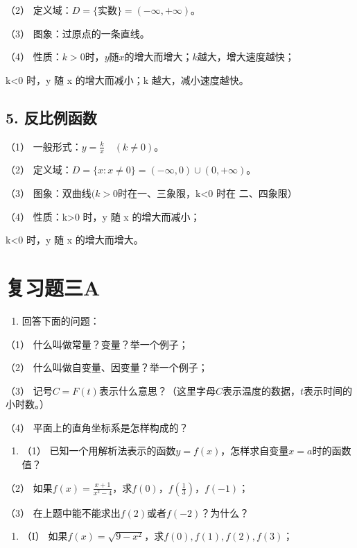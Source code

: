（2） 定义域：\(D = \{\text{实数}\} = (-\infty, +\infty)\)。

（3） 图象：过原点的一条直线。

（4）
性质：\(k > 0\)时，\(y\)随\(x\)的增大而增大；\(k\)越大，增大速度越快；

k\textless0 时，y 随 x 的增大而减小；\textbar k\textbar{}
越大，减小速度越快。

\subsection{5. 反比例函数}

（1） 一般形式：\(y = \frac{k}{x} \quad (k \neq 0)\)。

（2） 定义域：\(D = \{x: x \neq 0\} = (-\infty, 0) \cup (0, +\infty)\)。

（3） 图象：双曲线\((k>0\)时在一、三象限，k\textless0 时在 二、四象限）

（4） 性质：k\textgreater0 时，y 随 x 的增大而减小；

k\textless0 时，y 随 x 的增大而增大。

\section{复习题三A}

\begin{enumerate}
\item
  回答下面的问题：
\end{enumerate}

（1） 什么叫做常量？变量？举一个例子；

（2） 什么叫做自变量、因变量？举一个例子；

（3）
记号\(C = F(t)\)表示什么意思？（这里字母\(C\)表示温度的数据，\(t\)表示时间的小时数。）

（4） 平面上的直角坐标系是怎样构成的？

\begin{enumerate}[start=2]
\item
  （1）
  已知一个用解析法表示的函数\(y = f(x)\)，怎样求自变量\(x = a\)时的函数值？
\end{enumerate}

（2）
如果\(f(x)=\frac{x+1}{x^{2}-4}\)，求\(f(0)\)，\(f\left(\frac{1}{3}\right)\)，\(f(-1)\)；

（3） 在上题中能不能求出\(f(2)\)或者\(f(-2)\)？为什么？

\begin{enumerate}[start=3]
\item
  （I） 如果\(f(x) = \sqrt{9 - x^2}\)，求\(f(0), f(1), f(2), f(3)\)；
\end{enumerate}

